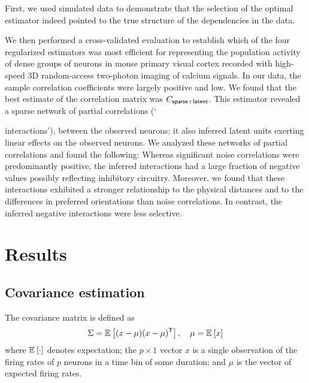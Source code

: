 First, we used simulated data to demonstrate that the selection of the optimal estimator indeed pointed to the true structure of the dependencies in the data.

We then performed a cross-validated evaluation to establish which of the four regularized estimators was most efficient for representing the population activity of dense groups of neurons in mouse primary visual cortex recorded with high-speed 3D random-access two-photon imaging of calcium signals. In our data, the sample correlation coefficients were largely positive and low.  We found that the best estimate of the correlation matrix was $C_{\sf sparse+latent}$.  This estimator revealed a sparse network of partial correlations (`{interactions'), between the observed neurons; it also inferred latent units exerting linear effects on the observed neurons. We analyzed these networks of partial correlations and found the following: Whereas significant noise correlations were predominantly positive, the inferred interactions had a large fraction of negative values possibly reflecting inhibitory circuitry.  Moreover, we found that these interactions exhibited a stronger relationship to the physical distances and to the differences in preferred orientations than noise correlations. In contrast, the inferred negative interactions were less selective.




\section*{Results}
\subsection*{Covariance estimation}
The covariance matrix is defined as
\begin{equation}\label{eq:true-covariance}
    \Sigma = \mathbb E_{}\left[ (x-\mu)(x-\mu)^{\sf T}\right],\quad \mu = \mathbb E_{}\left[ x\right]
    \end{equation}
    where $\mathbb E_{}\left[ \cdot\right]$ denotes expectation; the $p\times 1$ vector $x$ is a single observation of the firing rates of $p$ neurons in a time bin of some duration; and $\mu$ is the vector of expected firing rates. 

}

